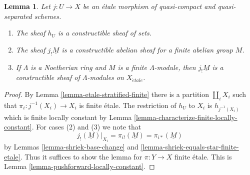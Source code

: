 \documentclass[10pt,a4paper]{amsart}
\theoremstyle{plain}
\newtheorem{lemma}[subsection]{Lemma}
\theoremstyle{definition}
\theoremstyle{remark}
\numberwithin{equation}{subsection}
\def\etale{{\acute{e}tale}}
\begin{document}
\begin{lemma}
\label{lemma-jshriek-constructible}
Let $j : U \to X$ be an \'etale morphism of quasi-compact and
quasi-separated schemes.
\begin{enumerate}
\item The sheaf $h_U$ is a constructible sheaf of sets.
\item The sheaf $j_!\underline{M}$ is a constructible abelian sheaf
for a finite abelian group $M$.
\item If $\Lambda$ is a Noetherian ring and $M$ is a finite $\Lambda$-module,
then $j_!\underline{M}$ is a constructible sheaf of $\Lambda$-modules
on $X_\etale$.
\end{enumerate}
\end{lemma}

\begin{proof}
By Lemma \ref{lemma-etale-stratified-finite} there is a partition
$\coprod_i X_i$ such that $\pi_i : j^{-1}(X_i) \to X_i$ is finite \'etale.
The restriction of $h_U$ to $X_i$ is $h_{j^{-1}(X_i)}$ which is finite
locally constant by Lemma \ref{lemma-characterize-finite-locally-constant}.
For cases (2) and (3) we note that
$$
j_!(\underline{M})|_{X_i} =
\pi_{i!}(\underline{M}) =
\pi_{i*}(\underline{M})
$$
by Lemmas \ref{lemma-shriek-base-change} and
\ref{lemma-shriek-equals-star-finite-etale}.
Thus it suffices to show the lemma for $\pi : Y \to X$ finite \'etale.
This is Lemma \ref{lemma-pushforward-locally-constant}.
\end{proof}
\end{document}
